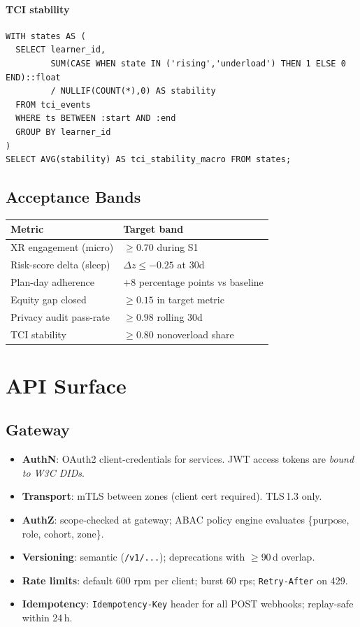 \documentclass[11pt]{article}
\theoremstyle{plain}
\begin{document}
\paragraph{TCI stability}
\begin{verbatim}
WITH states AS (
  SELECT learner_id,
         SUM(CASE WHEN state IN ('rising','underload') THEN 1 ELSE 0 END)::float
         / NULLIF(COUNT(*),0) AS stability
  FROM tci_events
  WHERE ts BETWEEN :start AND :end
  GROUP BY learner_id
)
SELECT AVG(stability) AS tci_stability_macro FROM states;
\end{verbatim}

\subsection{Acceptance Bands}
\begin{center}
\begin{tabular}{l l}
\hline
Metric & Target band \\
\hline
XR engagement (micro) & $\ge 0.70$ during S1 \\
Risk-score delta (sleep) & $\Delta z \le -0.25$ at 30d \\
Plan-day adherence & $+8$ percentage points vs baseline \\
Equity gap closed & $\ge 0.15$ in target metric \\
Privacy audit pass-rate & $\ge 0.98$ rolling 30d \\
TCI stability & $\ge 0.80$ nonoverload share \\
\hline
\end{tabular}
\end{center}

\section{API Surface}

\subsection{Gateway}
\begin{itemize}
  \item \textbf{AuthN}: OAuth2 client-credentials for services. JWT access tokens are \emph{bound to W3C DIDs}.
  \item \textbf{Transport}: mTLS between zones (client cert required). TLS\,1.3 only.
  \item \textbf{AuthZ}: scope-checked at gateway; ABAC policy engine evaluates \{purpose, role, cohort, zone\}.
  \item \textbf{Versioning}: semantic (\texttt{/v1/...}); deprecations with $\geq$90\,d overlap.
  \item \textbf{Rate limits}: default 600 rpm per client; burst 60 rps; \texttt{Retry-After} on 429.
  \item \textbf{Idempotency}: \texttt{Idempotency-Key} header for all POST webhooks; replay-safe within 24\,h.
\end{itemize}
\end{document}
